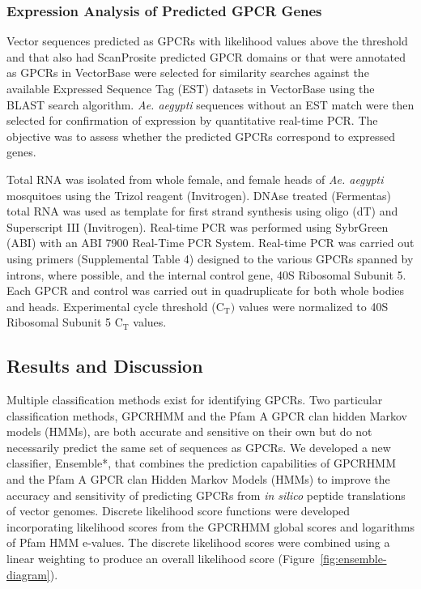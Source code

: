 \subsubsection{Expression Analysis of Predicted GPCR Genes}
Vector sequences predicted as GPCRs with likelihood values above the threshold and that also had ScanProsite predicted GPCR domains or that were annotated as GPCRs in VectorBase \cite{Lawson2009} were selected for similarity searches against the available Expressed Sequence Tag (EST) datasets in VectorBase using the BLAST search algorithm. \emph{Ae. aegypti} sequences without an EST match were then selected for confirmation of expression by quantitative real-time PCR. The objective was to assess whether the predicted GPCRs correspond to expressed genes.

Total RNA was isolated from whole female, and female heads of \emph{Ae. aegypti} mosquitoes using the Trizol reagent (Invitrogen).  DNAse treated (Fermentas) total RNA was used as template for first strand synthesis using oligo (dT) and Superscript III (Invitrogen).  Real-time PCR was performed using SybrGreen (ABI) with an ABI 7900 Real-Time PCR System.  Real-time PCR was carried out using primers (Supplemental Table 4) designed to the various GPCRs spanned by introns, where possible, and the internal control gene, 40S Ribosomal Subunit 5.  Each GPCR and control was carried out in quadruplicate for both whole bodies and heads.  Experimental cycle threshold ($\text{C}_\text{T})$ values were normalized to 40S Ribosomal Subunit 5 $\text{C}_{\text{T}}$ values.

\subsection{Results and Discussion}
\label{sec:results}
Multiple classification	methods	exist for identifying GPCRs. Two particular classification methods, GPCRHMM and	the Pfam A GPCR	clan hidden Markov models (HMMs), are both accurate and	sensitive on their own but do not necessarily predict the same set of sequences as GPCRs. We developed a new classifier, Ensemble*, that combines the prediction capabilities of GPCRHMM and the Pfam A GPCR clan Hidden Markov Models (HMMs) to improve the accuracy and sensitivity of predicting GPCRs from \emph{in silico} peptide translations of vector genomes. Discrete likelihood score functions were developed incorporating likelihood scores from the GPCRHMM global scores and logarithms of Pfam HMM e-values. The discrete likelihood scores were combined using a linear weighting to produce an overall likelihood score (Figure~\ref{fig:ensemble-diagram}).

